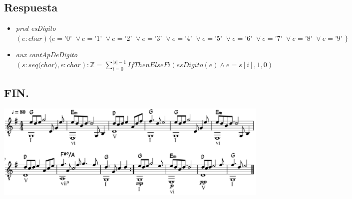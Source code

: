 \documentclass[a4paper]{article}
\begin{document}
\subsection*{Respuesta}
\begin{itemize}
\item \textit{pred esDigito}$(e:char)\{ e=\textrm{'0'\ }\vee e=\textrm{'1'\ }\vee e=\textrm{'2'\ }\vee e=\textrm{'3'\ }\vee e=\textrm{'4'\ }\vee e=\textrm{'5'\ }\vee e=\textrm{'6'\ }\vee e=\textrm{'7'\ }\vee e=\textrm{'8'\ }\vee e=\textrm{'9'\ }\}$

\item \textit{aux cantApDeDigito}$(s:seq\langle char\rangle,e: char):\mathbb{Z}
= \sum_{i=0}^{|s|-1} IfThenElseFi(esDigito(e)\wedge e=s[i],1,0)$
\end{itemize}
\begin{center}
\section*{FIN.}
\end{center}

\includegraphics[width=\linewidth]{Dia_de_la_Fugaceta_Estrellada2}
\end{document}
